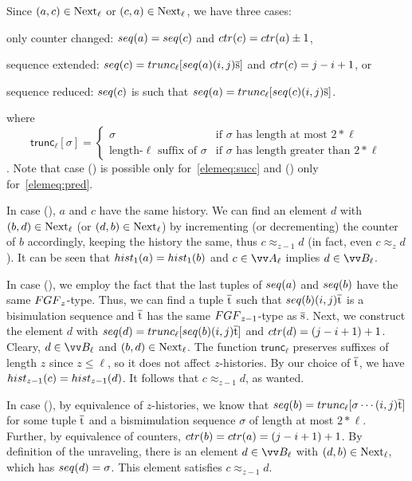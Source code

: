 \begin{proofsketch}
  Since $(a,c) \in \mathrm{Next}_{\ell}$ or $(c,a) \in \mathrm{Next}_{\ell}$, we have three cases:
  \begin{romanenumerate}
    \item only counter changed: $\seq{a} = \seq{c}$ and $\ctr{c} = \ctr{a} \pm 1$,
    \item sequence extended: $\seq{c} = \mathsf{trunc}_{\ell}[\seq{a} (i,j) \elemtuples]$ and $\ctr{c} = j-i+1$, or
    \item sequence reduced: $\seq{c}$ is such that $\seq{a} = \mathsf{trunc}_{\ell}[\seq{c} (i,j) \elemtuples]$.
  \end{romanenumerate}
  where
  \begin{displaymath}
    \mathsf{trunc}_{\ell}[\sigma] =
    \begin{cases}
      \sigma & \text{if $\sigma$ has length at most $2 * \ell$} \\
      \text{length-$\ell$ suffix of $\sigma$} & \text{if $\sigma$ has length greater than $2 * \ell$}
    \end{cases}
  \end{displaymath}.
  Note that case () is possible only for~\ref{elemeq:succ} and () only for~\ref{elemeq:pred}.

  In case (), $a$ and $c$ have the same history.
  We can find an element $d$ with $(b,d) \in \mathrm{Next}_{\ell}$ (or $(d,b) \in \mathrm{Next}_{\ell}$) by incrementing (or decrementing) the counter of $b$ accordingly, keeping the history the same, thus $c \approx_{z-1} d$ (in fact, even $c \approx_{z} d$).
  It can be seen that $\hist{1}{a} = \hist{1}{b}$ and $c \in \unraveldom{A}_{\ell}$ implies $d \in \unraveldom{B}_{\ell}$.

  In case (), we employ the fact that the last tuples of $\seq{a}$ and $\seq{b}$ have the same $\FGF_{z}$-type.
  Thus, we can find a tuple $\overline{\mathrm{t}}$ such that $\seq{b} (i,j) \elemtuplet$ is a bisimulation sequence and $\overline{\mathrm{t}}$ has the same $\FGF_{z-1}$-type as $\overline{\mathrm{s}}$.
  Next, we construct the element $d$ with $\seq{d} = \mathsf{trunc}_{\ell}[\seq{b}(i,j)\elemtuplet]$ and $\ctr{d} = (j-i+1) + 1$.
  Cleary, $d \in \unraveldom{B}_{\ell}$ and $(b,d) \in \mathrm{Next}_{\ell}$.
  The function $\mathsf{trunc}_{\ell}$ preserves suffixes of length $z$ since $z \le \ell$, so it does not affect $z$-histories.
  By our choice of $\overline{\mathrm{t}}$, we have $\hist{z-1}{c} = \hist{z-1}{d}$.
  It follows that $c \approx_{z-1} d$, as wanted.

  In case (), by equivalence of $z$-histories, we know that $\seq{b} = \mathsf{trunc}_{\ell}[\sigma \cdots(i,j)\elemtuplet]$ for some tuple $\overline{\mathrm{t}}$ and a bismimulation sequence $\sigma$ of length at most $2 * \ell$.
  Further, by equivalence of counters, $\ctr{b} = \ctr{a} = (j-i+1) + 1$.
  By definition of the unraveling, there is an element $d \in \unraveldom{B}_{\ell}$ with $(d,b) \in \mathrm{Next}_{\ell}$, which has $\seq{d} = \sigma$.
  This element satisfies $c \approx_{z-1} d$.
\end{proofsketch}
